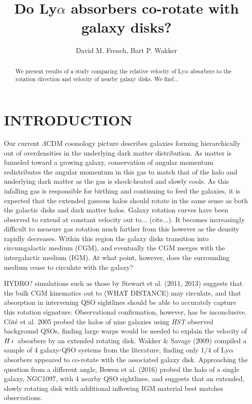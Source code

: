 \documentclass[iop]{emulateapj-rtx4}
\newcommand{\HI}{$H\,{\sc i}$}
\begin{document}
\title{Do Ly$\alpha$ absorbers co-rotate with galaxy disks?}

\author{David M. French, Bart P. Wakker}


\begin{abstract}

We present results of a study comparing the relative velocity of Ly$\alpha$ absorbers to the rotation direction and velocity of nearby galaxy disks. We find...

\end{abstract}




\section{INTRODUCTION}
Our current $\Lambda$CDM cosmology picture describes galaxies forming hierarchically out of overdensities in the underlying dark matter distribution. As matter is funneled toward a growing galaxy, conservation of angular momentum redistributes the angular momentum in this gas to match that of the halo and underlying dark matter as the gas is shock-heated and slowly cools. As this infalling gas is responsible for birthing and continuing to feed the galaxies, it is expected that the extended gaseous halos should rotate in the same sense as both the galactic disks and dark matter halos. Galaxy rotation curves have been observed to extend at constant velocity out to... (cite...). It becomes increasingly difficult to measure gas rotation much farther from this however as the density rapidly decreases. Within this region the galaxy disks transition into circumgalactic medium (CGM), and eventually the CGM merges with the intergalactic medium (IGM). At what point, however, does the surrounding medium cease to circulate with the galaxy? 

HYDRO? simulations such as those by Stewart et al. (2011, 2013) suggests that the bulk CGM kinematics out to (WHAT DISTANCE) may circulate, and that absorption in intervening QSO sightlines should be able to accurately capture this rotation signature. Observational confirmation, however, has be inconclusive. C\^{o}t\'{e} et al. 2005 probed the halos of nine galaxies using \emph{HST} observed background QSOs, finding large warps would be needed to explain the velocity of \HI~absorbers by an extended rotating disk. Wakker \& Savage (2009) compiled a sample of 4 galaxy-QSO systems from the literature, finding only 1/4 of Ly$\alpha$ absorbers appeared to co-rotate with the associated galaxy disk. Approaching the question from a different angle, Bowen et al. (2016) probed the halo of a single galaxy, NGC1097, with 4 nearby QSO sightlines, and suggests that an extended, slowly rotating disk with additional inflowing IGM material best matches observations.
\end{document}
